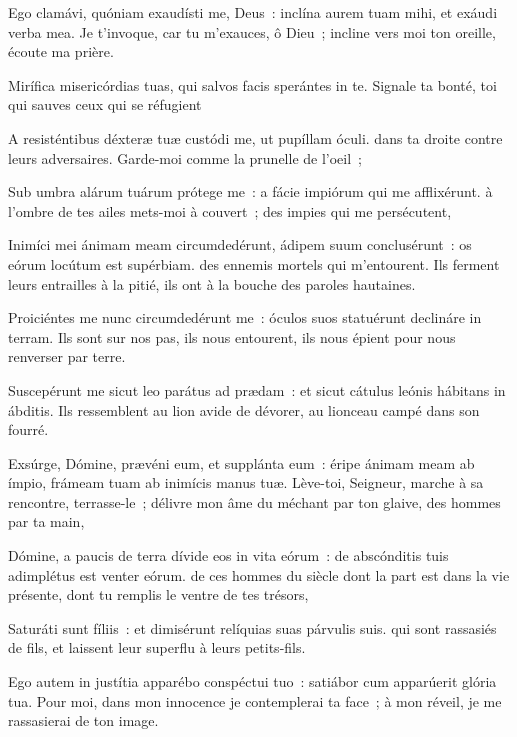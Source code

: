 \begin{paracol}{2}

\LigneParacol{0cm}
{Ego clamávi, quóniam exaudísti me, Deus~: \GreStar{} inclína aurem tuam mihi, et exáudi verba mea.}
{Je t'invoque, car tu m'exauces, ô Dieu~; incline vers moi ton oreille, écoute ma prière. }

\LigneParacol{0.2cm}
{Mirífica misericórdias tuas, \GreStar{} qui salvos facis sperántes in te.}
{Signale ta bonté, toi qui sauves ceux qui se réfugient}

\LigneParacol{0.2cm}
{A resisténtibus déxteræ tuæ custódi me, \GreStar{} ut pupíllam óculi.}
{dans ta droite contre leurs adversaires. Garde-moi comme la prunelle de l'oeil~;}

\LigneParacol{0.2cm}
{Sub umbra alárum tuárum prótege me~: \GreStar{} a fácie impiórum qui me afflixérunt.}
{à l'ombre de tes ailes mets-moi à couvert~; des impies qui me persécutent,}

\LigneParacol{0.2cm}
{Inimíci mei ánimam meam circumdedérunt, ádipem suum conclusérunt~: \GreStar{} os eórum locútum est supérbiam.}
{des ennemis mortels qui m'entourent. Ils ferment leurs entrailles à la pitié, ils ont à la bouche des paroles hautaines. }

\LigneParacol{0.2cm}
{Proiciéntes me nunc circumdedérunt me~: \GreStar{} óculos suos statuérunt declináre in terram.}
{Ils sont sur nos pas, ils nous entourent, ils nous épient pour nous renverser par terre. }

\LigneParacol{0.2cm}
{Suscepérunt me sicut leo parátus ad prædam~: \GreStar{} et sicut cátulus leónis hábitans in ábditis.}
{Ils ressemblent au lion avide de dévorer, au lionceau campé dans son fourré. }

\end{paracol}
\Gloria
\begin{paracol}{2}

\LigneParacol{0cm}
{Exsúrge, Dómine, prævéni eum, et supplánta eum~: \GreStar{} éripe ánimam meam ab ímpio, frámeam tuam ab inimícis manus tuæ.}
{Lève-toi, Seigneur, marche à sa rencontre, terrasse-le~; délivre mon âme du méchant par ton glaive, des hommes par ta main,}

\LigneParacol{0.2cm}
{Dómine, a paucis de terra dívide eos in vita eórum~: \GreStar{} de abscónditis tuis adimplétus est venter eórum.}
{de ces hommes du siècle dont la part est dans la vie présente, dont tu remplis le ventre de tes trésors,}

\LigneParacol{0.2cm}
{Saturáti sunt fíliis~: \GreStar{} et dimisérunt relíquias suas párvulis suis.}
{qui sont rassasiés de fils, et laissent leur superflu à leurs petits-fils. }

\LigneParacol{0.2cm}
{Ego autem in justítia apparébo conspéctui tuo~: \GreStar{} satiábor cum apparúerit glória tua.}
{Pour moi, dans mon innocence je contemplerai ta face~; à mon réveil, je me rassasierai de ton image. }

\end{paracol}
